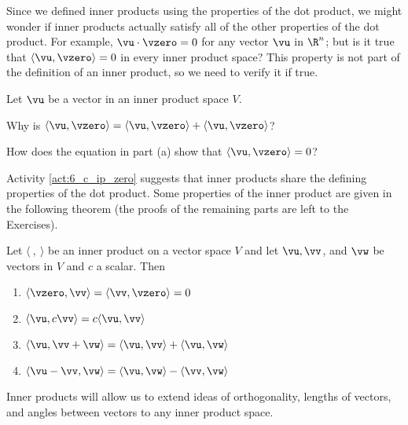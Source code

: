 Since we defined inner products using the properties of the dot product, we might wonder if inner products actually satisfy all of the other properties of the dot product. For example, $\vu \cdot \vzero = 0$ for any vector $\vu$ in $\R^n$; but is it true that $\langle \vu, \vzero \rangle = 0$ in every inner product space? This property is not part of the definition of an inner product, so we need to verify it if true. 


\begin{activity} \label{act:6_c_ip_zero} Let $\vu$ be a vector in an inner product space $V$. 
    \ba
    \item Why is $\langle \vu, \vzero \rangle = \langle \vu, \vzero \rangle + \langle \vu, \vzero \rangle$?

    

    \item How does the equation in part (a) show that $\langle \vu, \vzero \rangle = 0$?

    

    \ea
\end{activity}

Activity \ref{act:6_c_ip_zero} suggests that inner products share the defining properties of the dot product. Some properties of the inner product are given in the following theorem (the proofs of the remaining parts are left to the Exercises).

\begin{theorem} \label{thm:6_c_inner_product_properties} Let $\langle \ , \ \rangle$ be an inner product on a vector space $V$ and let $\vu, \vv$, and $\vw$ be vectors in $V$ and $c$ a scalar. Then
\begin{enumerate}
	\item $\langle \vzero , \vv \rangle = \langle \vv , \vzero \rangle = 0$
	\item $\langle \vu , c\vv \rangle = c\langle \vu , \vv \rangle$
	\item $\langle \vu , \vv+\vw \rangle = \langle \vu , \vv \rangle + \langle \vu , \vw \rangle$
\item $\langle \vu - \vv, \vw \rangle = \langle \vu , \vw \rangle - \langle \vv , \vw \rangle$
\end{enumerate}
\end{theorem}

Inner products will allow us to extend ideas of orthogonality, lengths of vectors, and angles between vectors to any inner product space.  


